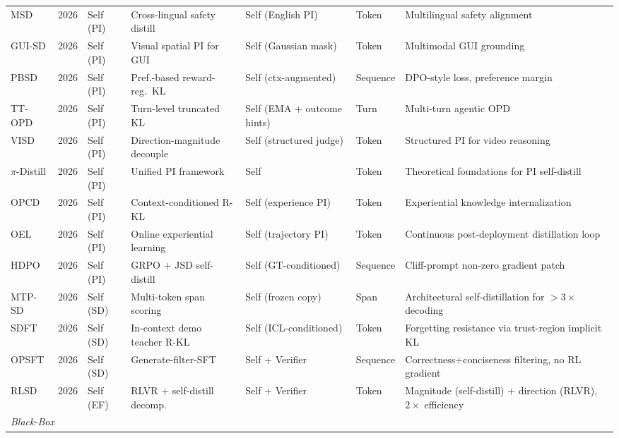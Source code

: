 \documentclass{article} %
\begin{document}
\begin{table}[t]
{\begin{tabular}{@{}lclllll@{}}
        MSD \citep{qin2026msd} & 2026 & Self (PI) & Cross-lingual safety distill & Self (English PI) & Token & Multilingual safety alignment \\
        GUI-SD \citep{zhang2026guisd} & 2026 & Self (PI) & Visual spatial PI for GUI & Self (Gaussian mask) & Token & Multimodal GUI grounding \\
        PBSD \citep{pbsd2026} & 2026 & Self (PI) & Pref.-based reward-reg.\ KL & Self (ctx-augmented) & Sequence & DPO-style loss, preference margin \\
        TT-OPD \citep{ttopd2026} & 2026 & Self (PI) & Turn-level truncated KL & Self (EMA + outcome hints) & Turn & Multi-turn agentic OPD \\
        VISD \citep{lin2026visd} & 2026 & Self (PI) & Direction-magnitude decouple & Self (structured judge) & Token & Structured PI for video reasoning \\
        $\pi$-Distill \citep{2602.04942} & 2026 & Self (PI) & Unified PI framework & Self & Token & Theoretical foundations for PI self-distill \\
        OPCD \citep{2602.12275} & 2026 & Self (PI) & Context-conditioned R-KL & Self (experience PI) & Token & Experiential knowledge internalization \\
        OEL \citep{2603.16856} & 2026 & Self (PI) & Online experiential learning & Self (trajectory PI) & Token & Continuous post-deployment distillation loop \\
        HDPO \citep{2603.23871} & 2026 & Self (PI) & GRPO + JSD self-distill & Self (GT-conditioned) & Sequence & Cliff-prompt non-zero gradient patch \\
        MTP-SD \citep{2602.06019} & 2026 & Self (SD) & Multi-token span scoring & Self (frozen copy) & Span & Architectural self-distillation for $>3\times$ decoding \\
        SDFT \citep{2601.19897} & 2026 & Self (SD) & In-context demo teacher R-KL & Self (ICL-conditioned) & Token & Forgetting resistance via trust-region implicit KL \\
        OPSFT \citep{zhao2026onpolicy} & 2026 & Self (SD) & Generate-filter-SFT & Self + Verifier & Sequence & Correctness+conciseness filtering, no RL gradient \\
        RLSD \citep{yang2026selfdistilled} & 2026 & Self (EF) & RLVR + self-distill decomp. & Self + Verifier & Token & Magnitude (self-distill) + direction (RLVR), $2\times$ efficiency \\
        \midrule
        \multicolumn{7}{l}{\textit{Black-Box}} \\

\end{tabular}}
\end{table}
\end{document}
